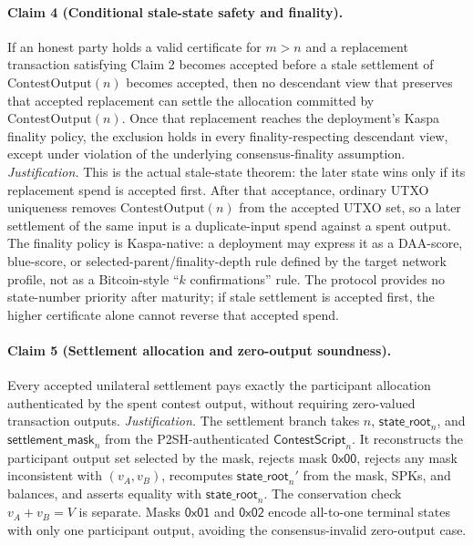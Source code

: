 \documentclass[10pt,a4paper]{article}
\begin{document}
\paragraph{Claim 4 (Conditional stale-state safety and finality).} If an honest party holds a valid certificate for $m>n$ and a replacement transaction satisfying Claim 2 becomes accepted before a stale settlement of $\mathrm{ContestOutput}(n)$ becomes accepted, then no descendant view that preserves that accepted replacement can settle the allocation committed by $\mathrm{ContestOutput}(n)$. Once that replacement reaches the deployment's Kaspa finality policy, the exclusion holds in every finality-respecting descendant view, except under violation of the underlying consensus-finality assumption. \emph{Justification.} This is the actual stale-state theorem: the later state wins only if its replacement spend is accepted first. After that acceptance, ordinary UTXO uniqueness removes $\mathrm{ContestOutput}(n)$ from the accepted UTXO set, so a later settlement of the same input is a duplicate-input spend against a spent output. The finality policy is Kaspa-native: a deployment may express it as a DAA-score, blue-score, or selected-parent/finality-depth rule defined by the target network profile, not as a Bitcoin-style ``$k$ confirmations'' rule. The protocol provides no state-number priority after maturity; if stale settlement is accepted first, the higher certificate alone cannot reverse that accepted spend.

\paragraph{Claim 5 (Settlement allocation and zero-output soundness).} Every accepted unilateral settlement pays exactly the participant allocation authenticated by the spent contest output, without requiring zero-valued transaction outputs. \emph{Justification.} The settlement branch takes $n$, $\mathsf{state\_root}_n$, and $\mathsf{settlement\_mask}_n$ from the P2SH-authenticated $\mathsf{ContestScript}_n$. It reconstructs the participant output set selected by the mask, rejects mask $\mathsf{0x00}$, rejects any mask inconsistent with $(v_A,v_B)$, recomputes $\mathsf{state\_root}_n'$ from the mask, SPKs, and balances, and asserts equality with $\mathsf{state\_root}_n$. The conservation check $v_A+v_B=V$ is separate. Masks $\mathsf{0x01}$ and $\mathsf{0x02}$ encode all-to-one terminal states with only one participant output, avoiding the consensus-invalid zero-output case.
\end{document}

